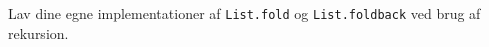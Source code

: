 \label{fold}Lav dine egne implementationer af \lstinline{List.fold} og \lstinline{List.foldback} ved brug af rekursion. 
